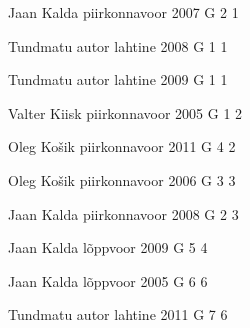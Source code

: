 \documentclass[11pt]{article}
\begin{document}
{Jaan Kalda} %
{piirkonnavoor} %
{2007} %
{G 2} %
{1} %
{

\ifEngHint
\fi
}

{Tundmatu autor} %
{lahtine} %
{2008} %
{G 1} %
{1} %
{

\ifEngHint
\fi
}

{Tundmatu autor} %
{lahtine} %
{2009} %
{G 1} %
{1} %
{

\ifEngHint
\fi
}

{Valter Kiisk} %
{piirkonnavoor} %
{2005} %
{G 1} %
{2} %
{

\ifEngHint
\fi
}

{Oleg Košik} %
{piirkonnavoor} %
{2011} %
{G 4} %
{2} %
{

\ifEngHint
\fi
}

{Oleg Košik} %
{piirkonnavoor} %
{2006} %
{G 3} %
{3} %
{

\ifEngHint
\fi
}

{Jaan Kalda} %
{piirkonnavoor} %
{2008} %
{G 2} %
{3} %
{

\ifEngHint
\fi
}

{Jaan Kalda} %
{lõppvoor} %
{2009} %
{G 5} %
{4} %
{

\ifEngHint
\fi
}

{Jaan Kalda} %
{lõppvoor} %
{2005} %
{G 6} %
{6} %
{

\ifEngHint
\fi
}

{Tundmatu autor} %
{lahtine} %
{2011} %
{G 7} %
{6} %
{

\ifEngHint
\fi
}
\end{document}
